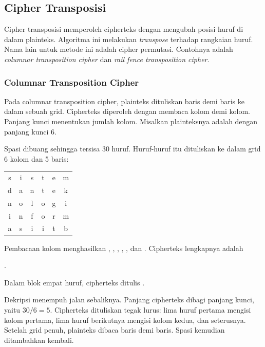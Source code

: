\subsection{Cipher Transposisi}
\label{sec:transposisi}

Cipher transposisi memperoleh cipherteks dengan mengubah posisi huruf di dalam
plainteks. Algoritma ini melakukan \textit{transpose} terhadap rangkaian huruf.
Nama lain untuk metode ini adalah cipher permutasi. Contohnya adalah
\textit{columnar transposition cipher} dan \textit{rail fence transposition
cipher}.

\subsubsection{Columnar Transposition Cipher}
\label{sec:transposisi-kolom}

Pada columnar transposition cipher, plainteks dituliskan baris demi baris ke
dalam sebuah grid. Cipherteks diperoleh dengan membaca kolom demi kolom.
Panjang kunci menentukan jumlah kolom. Misalkan plainteksnya adalah
 dengan panjang kunci 6.

Spasi dibuang sehingga tersisa 30 huruf. Huruf-huruf itu dituliskan ke dalam
grid 6 kolom dan 5 baris:
\begin{center}
\begin{tabular}{@{}cccccc@{}}
s & i & s & t & e & m \\
d & a & n & t & e & k \\
n & o & l & o & g & i \\
i & n & f & o & r & m \\
a & s & i & i & t & b \\
\end{tabular}
\end{center}
Pembacaan kolom menghasilkan , , ,
, , dan . Cipherteks lengkapnya adalah
\begin{center}
.
\end{center}
Dalam blok empat huruf, cipherteks ditulis
.

Dekripsi menempuh jalan sebaliknya. Panjang cipherteks dibagi panjang kunci,
yaitu $30/6=5$. Cipherteks dituliskan tegak lurus: lima huruf pertama mengisi
kolom pertama, lima huruf berikutnya mengisi kolom kedua, dan seterusnya.
Setelah grid penuh, plainteks dibaca baris demi baris. Spasi kemudian
ditambahkan kembali.

